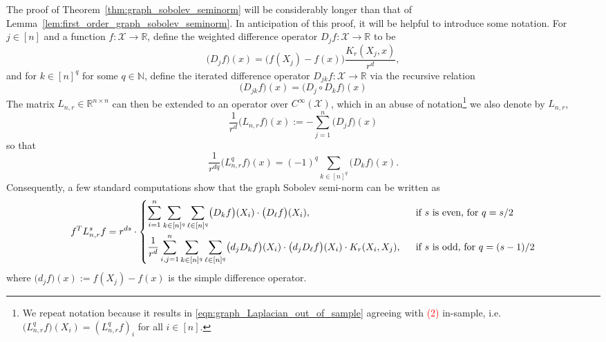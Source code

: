 \documentclass{article}
\newcommand{\Reals}{\mathbb{R}}
\newcommand{\1}{\mathbf{1}}
\newcommand{\Lap}{L}
\newcommand{\Xset}{\mathcal{X}}
\theoremstyle{alden}
\theoremstyle{aldenthm}
\theoremstyle{definition}
\theoremstyle{remark}
\begin{document}
The proof of Theorem~\ref{thm:graph_sobolev_seminorm} will be considerably longer than that of Lemma~\ref{lem:first_order_graph_sobolev_seminorm}. In anticipation of this proof, it will be helpful to introduce some notation. For $j \in [n]$ and a function $f: \Xset \to \Reals$, define the weighted difference operator $D_jf: \Xset \to \Reals$ to be
\begin{equation*}
\bigl(D_jf\bigr)(x) = \bigl(f(X_j) - f(x)\bigr) \frac{K_r(X_j,x)}{r^d},
\end{equation*}
and for $k \in [n]^q$ for some $q \in \mathbb{N}$, define the iterated difference operator $D_{jk}f: \Xset \to \Reals$ via the recursive relation
\begin{equation*}
\bigl(D_{jk}f\bigr)(x) = \bigl(D_j \circ D_kf\bigr)(x)
\end{equation*}
The matrix $\Lap_{n,r} \in \Reals^{n \times n}$ can then be extended to an operator over $C^{\infty}(\Xset)$, which in an abuse of notation\footnote{We repeat notation because it results in \eqref{eqn:graph_Laplacian_out_of_sample} agreeing with \textcolor{red}{(2)} in-sample, i.e. $\bigl(\Lap_{n,r}^qf\bigr)(X_i) = (\Lap_{n,r}^qf)_i$ for all $i \in [n]$.} we also denote by $\Lap_{n,r}$,
\begin{equation*}
\frac{1}{r^d}\bigl(\Lap_{n,r}f\bigr)(x) := -\sum_{j = 1}^{n} \bigl(D_jf\bigr)(x)
\end{equation*}
so that
\begin{equation}
\label{eqn:graph_Laplacian_out_of_sample}
\frac{1}{r^{dq}}\bigl(\Lap_{n,r}^qf\bigr)(x) = (-1)^q \sum_{k \in [n]^q} \bigl(D_kf\bigr)(x).
\end{equation} 
Consequently, a few standard computations show that the graph Sobolev semi-norm can be written as 
\begin{equation}
\label{eqn:graph_sobolev_seminorm_1}
f^T \Lap_{n,r}^s f = r^{ds} \cdot
\begin{dcases}
\sum_{i = 1}^{n} \sum_{k \in [n]^q} \sum_{\ell \in [n]^q} \bigl(D_kf\bigr)(X_i) \cdot \bigl(D_\ell f\bigr)(X_i),~~ & \textrm{if $s$ is even, for $q = s/2$} \\
\frac{1}{r^d}\sum_{i,j = 1}^{n} \sum_{k \in [n]^q} \sum_{\ell \in [n]^q} \bigl(d_jD_kf\bigr)(X_i) \cdot \bigl(d_jD_{\ell}f\bigr)(X_i) \cdot K_r(X_i,X_j),~~ & \textrm{if $s$ is odd, for $q = (s - 1)/2$}
\end{dcases}
\end{equation}
where $\bigl(d_jf\bigr)(x) := f(X_j) - f(x)$ is the simple difference operator. 
\end{document}
